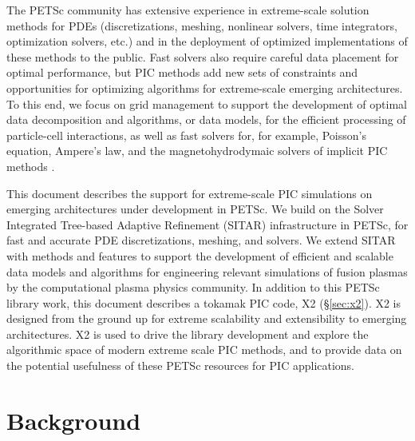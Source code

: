 \documentclass[review]{siamart}
\begin{document}
The PETSc community has extensive experience in extreme-scale solution methods for PDEs (discretizations, meshing,  nonlinear solvers, time integrators, optimization solvers, etc.) and in the deployment of optimized implementations of these methods to the public.
Fast solvers also require careful data placement for optimal performance, but PIC methods add new sets of constraints and opportunities for optimizing algorithms for extreme-scale emerging architectures.
To this end, we focus on grid management to support the development of optimal data decomposition and algorithms, or data models,  for the efficient processing of particle-cell interactions, as well as fast solvers for, for example, Poisson's equation, Ampere's law, and the magnetohydrodymaic  solvers of implicit PIC methods \cite{DBLP:journals/cphysics/ChenC15}.

This document describes the support for extreme-scale PIC simulations on emerging architectures under development in PETSc.
We build on the Solver Integrated Tree-based Adaptive Refinement (SITAR) infrastructure in PETSc, for fast and accurate PDE discretizations, meshing, and solvers.
We extend SITAR with methods and features to support the development of efficient and scalable data models and algorithms for engineering relevant simulations of fusion plasmas by the computational plasma physics community.
In addition to this PETSc library work, this document describes a tokamak PIC code, X2 (\S\ref{sec:x2}).
X2 is designed from the ground up for extreme scalability and extensibility to emerging architectures.
X2 is used to drive the library development and explore the algorithmic space of modern extreme scale PIC methods, and to provide data on the potential usefulness of these PETSc resources for PIC applications.

\section{Background}
\end{document}
